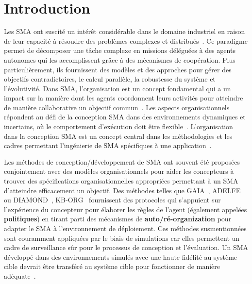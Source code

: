 \documentclass[contribution]{jfsma}
\begin{document}
\section{Introduction}


Les SMA ont suscité un intérêt considérable dans le domaine industriel en raison de leur capacité à résoudre des problèmes complexes et distribués~\cite{Raileanu2023}.
Ce paradigme permet de décomposer une tâche complexe en missions déléguées à des agents autonomes qui les accomplissent grâce à des mécanismes de coopération. Plus particulièrement, ils fournissent des modèles et des approches pour gérer des objectifs contradictoires, le calcul parallèle, la robustesse du système et l'évolutivité.
Dans SMA, l'organisation est un concept fondamental qui a un impact sur la manière dont les agents coordonnent leurs activités pour atteindre de manière collaborative un objectif commun~\cite{Hubner2007}.
Les aspects organisationnels répondent au défi de la conception SMA dans des environnements dynamiques et incertains, où le comportement d'exécution doit être flexible~\cite{Kathleen2020}. L'organisation dans la conception SMA est un concept central dans les méthodologies et les cadres permettant l'ingénierie de SMA spécifiques à une application~\cite{Bakliwal2018}.

Les méthodes de conception/développement de SMA ont souvent été proposées conjointement avec des modèles organisationnels pour aider les concepteurs à trouver des spécifications organisationnelles appropriées permettant à un SMA d'atteindre efficacement un objectif. Des méthodes telles que GAIA~\cite{Wooldridge2000,Cernuzzi2014}, ADELFE~\cite{Mefteh2015} ou DIAMOND~\cite{Jamont2015}, KB-ORG~\cite{Sims2008} fournissent des protocoles qui s'appuient sur l'expérience du concepteur pour élaborer les règles de l'agent (également appelées \textbf{politiques}) en tirant parti des mécanismes de \textbf{auto/ré-organization} pour adapter le SMA à l'environnement de déploiement.
Ces méthodes susmentionnées sont couramment appliquées par le biais de simulations car elles permettent un cadre de surveillance sûr pour le processus de conception et l'évaluation. Un SMA développé dans des environnements simulés avec une haute fidélité au système cible devrait être transféré au système cible pour fonctionner de manière adéquate~\cite{Schon2021}.
\end{document}
